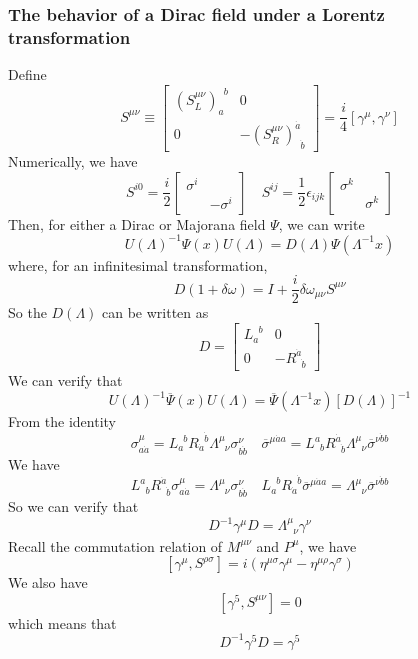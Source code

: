 \documentclass[cyan]{elegantnote}
\begin{document}
\subsubsection{The behavior of a Dirac field under
a Lorentz transformation}
\noindent
Define
\[S^{\mu \nu} \equiv \left[ \begin{matrix} (S_L^{\mu\nu})_a^{\phantom{a}b}& 0\\ 0& -(S_R^{\mu\nu})^{\dot{a}}_{\phantom{\dot{a}} \dot{b}}\end{matrix} \right] = \frac{i}{4}[\gamma^{\mu},\gamma^{\nu}] \]
Numerically, we have
\[S^{i0} = \frac{i}{2} \left[ \begin{matrix} \sigma ^{i}& \\ & -\sigma ^{i}\end{matrix} \right] \quad S^{ij} = \frac{1}{2} \epsilon_{ijk} \left[ \begin{matrix} \sigma ^{k}& \\ & \sigma ^{k}\end{matrix} \right] \]
Then, for either a Dirac or Majorana field $\Psi$, we can write
\[U(\Lambda)^{-1} \Psi(x) U(\Lambda) = D(\Lambda) \Psi(\Lambda^{-1}x)\]
where, for an infinitesimal transformation,
\[D(1+\delta \omega) = I + \frac{i}{2} \delta \omega_{\mu \nu} S^{\mu \nu}\]
So the $D(\Lambda)$ can be written as
\[D = \left[ \begin{matrix} L_a^{\phantom{a}b}& 0\\ 0& -R^{\dot{a}}_{\phantom{\dot{a}} \dot{b}}\end{matrix} \right]  \]
We can verify that
\[U(\Lambda)^{-1} \overline{\Psi}(x) U(\Lambda) = \overline{\Psi}(\Lambda^{-1}x)[D(\Lambda)]^{-1} \]
From the identity
\[\sigma^{\mu}_{a\dot{a}} = L_a^{\phantom{a}b} R_{\dot{a}}^{\phantom{\dot{a}} \dot{b}} \Lambda^{\mu}_{\phantom{\mu} \nu} \sigma^{\nu}_{b\dot{b}} \quad \overline{\sigma}^{\mu \dot{a} a} = L^a_{\phantom{a}b} R^{\dot{a}}_{\phantom{\dot{a}} \dot{b}} \Lambda^{\mu}_{\phantom{\mu} \nu} \overline{\sigma}^{\nu\dot{b}b}\]
We have
\[L^a_{\phantom{a}b} R^{\dot{a}}_{\phantom{\dot{a}} \dot{b}} \sigma^{\mu}_{a\dot{a}} =  \Lambda^{\mu}_{\phantom{\mu} \nu} \sigma^{\nu}_{b\dot{b}} \quad L_a^{\phantom{a}b} R_{\dot{a}}^{\phantom{\dot{a}} \dot{b}} \overline{\sigma}^{\mu \dot{a} a} =  \Lambda^{\mu}_{\phantom{\mu} \nu} \overline{\sigma}^{\nu\dot{b}b}\]
So we can verify that
\[D^{-1} \gamma^{\mu} D = \Lambda^{\mu}_{\phantom{\mu} \nu} \gamma^{\nu}\]
Recall the commutation relation of $M^{\mu \nu}$ and $P^{\mu}$, we have
\[[\gamma^{\mu},S^{\rho \sigma}] = i(\eta^{\mu \sigma}\gamma^{\mu} - \eta^{\mu \rho}\gamma^{\sigma})\]
We also have
\[[\gamma^5,S^{\mu \nu}] = 0\]
which means that
\[D^{-1} \gamma^{5} D =  \gamma^{5}\]
\end{document}
